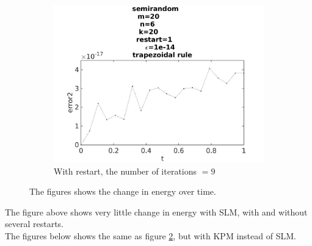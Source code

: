 \begin{figure}[H]
\begin{subfigure}[b]{0.3\textwidth}
                \includegraphics[width=\textwidth]{../MATLAB/fig/errortestrestart12.jpg}
                \caption{ With restart, the number of iterations $= 9$ }
                \label{fig:energytestrestart12}
        \end{subfigure}
        \caption{ The figures shows the change in energy over time.}
        \label{fig:energytestrestart2}
\end{figure}
The figure above shows very little change in energy with SLM, with and without several restarts. \\

The figures below shows the same as figure \ref{fig:energytestrestart2}, but with KPM instead of SLM. 


